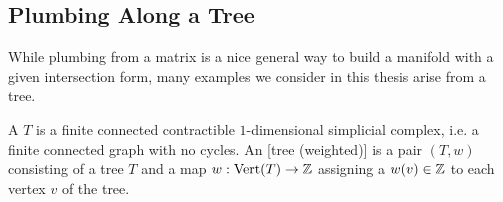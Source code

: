 \subsection{Plumbing Along a Tree}

While plumbing from a matrix is a nice general way to build a manifold with a given intersection form, many examples we consider in this thesis arise from a tree.

\begin{definition}
	A  $T$ is a finite connected contractible $1$-dimensional simplicial complex, i.e. a finite connected graph with no cycles. An [tree (weighted)] is a pair $(T,w)$ consisting of a tree $T$ and a map $w : \operatorname{Vert}(T) \to \mathbb{Z}$ assigning a  $w(v)\in \mathbb{Z}$ to each vertex $v$ of the tree.
\end{definition}


